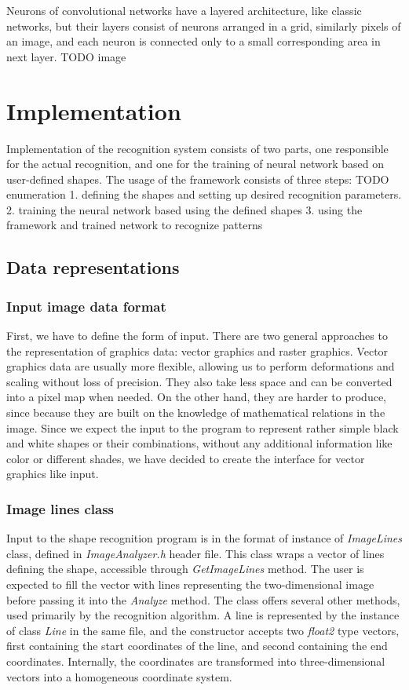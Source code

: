 Neurons of convolutional networks have a layered architecture, like classic networks, but their layers consist of neurons arranged in a grid, similarly pixels of an image, and each neuron is connected only to a small corresponding area in next layer.  
TODO image
\chapter{Implementation}
Implementation of the recognition system consists of two parts, one responsible for the actual recognition, and one for the training of neural network based on user-defined shapes. The usage of the framework consists of three steps: TODO enumeration
1. defining the shapes and setting up desired recognition parameters.
2. training the neural network based using the defined shapes
3. using the framework and trained network to recognize patterns

\section{Data representations}

\subsection{Input image data format}
First, we have to define the form of input. There are two general approaches to the representation of graphics data: vector graphics and raster graphics. Vector graphics data are usually more flexible, allowing us to perform deformations and scaling without loss of precision. They also take less space and can be converted into a pixel map when needed. On the other hand, they are harder to produce, since because they are built on the knowledge of mathematical relations in the image. Since we expect the input to the program to represent rather simple black and white shapes or their combinations, without any additional information like color or different shades, we have decided to create the interface for vector graphics like input.

\subsection{Image lines class}
Input to the shape recognition program is in the format of instance of \emph{ImageLines} class, defined in \emph{ImageAnalyzer.h} header file. This class wraps a vector of lines defining the shape, accessible through \emph{GetImageLines} method. The user is expected to fill the vector with lines representing the two-dimensional image before passing it into the \emph{Analyze} method. The class offers several other methods, used primarily by the recognition algorithm. 
A line is represented by the instance of class \emph{Line} in the same file, and the constructor accepts two \emph{float2} type vectors, first containing the start coordinates of the line, and second containing the end coordinates. Internally, the coordinates are transformed into three-dimensional vectors into a homogeneous coordinate system. 

